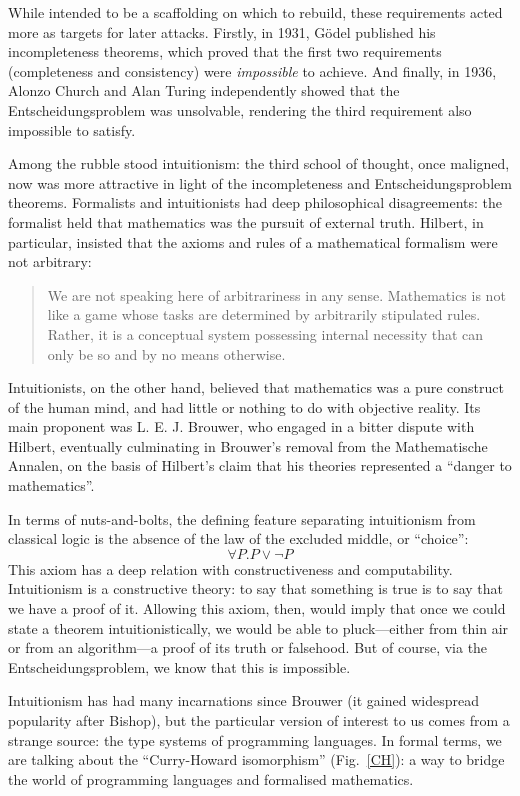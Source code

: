\documentclass[12pt]{article}
\begin{document}
While intended to be a scaffolding on which to rebuild, these requirements acted
more as targets for later attacks.
Firstly, in 1931, Gödel published his incompleteness theorems, which proved that the
first two requirements (completeness and consistency) were \emph{impossible} to
achieve.
And finally, in 1936, Alonzo Church and Alan Turing independently showed that
the Entscheidungsproblem was unsolvable, rendering the third requirement also
impossible to satisfy.

Among the rubble stood intuitionism: the third school of thought, once maligned,
now was more attractive in light of the incompleteness and Entscheidungsproblem
theorems.
Formalists and intuitionists had deep philosophical disagreements: the formalist
held that mathematics was the pursuit of external truth.
Hilbert, in particular, insisted that the axioms and rules of a mathematical
formalism were not arbitrary:
\begin{quote}
  We are not speaking here of arbitrariness in any sense. Mathematics is not
  like a game whose tasks are determined by arbitrarily stipulated rules.
  Rather, it is a conceptual system possessing internal necessity that can only
  be so and by no means otherwise.
\end{quote}
Intuitionists, on the other hand, believed that mathematics was a pure
construct of the human mind, and had little or nothing to do with objective
reality.
Its main proponent was L. E. J. Brouwer, who engaged in a bitter dispute with
Hilbert, eventually culminating in Brouwer's removal from the Mathematische
Annalen, on the basis of Hilbert's claim that his theories represented a
``danger to mathematics''.

In terms of nuts-and-bolts, the defining feature separating intuitionism from
classical logic is the absence of the law of the excluded middle, or ``choice'':
\begin{equation}
  \forall P. P \vee \neg P
\end{equation}
This axiom has a deep relation with constructiveness and computability.
Intuitionism is a constructive theory: to say that something is true is to say
that we have a proof of it.
Allowing this axiom, then, would imply that once we could state a theorem
intuitionistically, we would be able to pluck---either from thin air or from an
algorithm---a proof of its truth or falsehood.
But of course, via the Entscheidungsproblem, we know that this is impossible.

Intuitionism has had many incarnations since Brouwer (it gained widespread
popularity after Bishop), but the particular version of interest to us comes
from a strange source: the type systems of programming languages.
In formal terms, we are talking about the ``Curry-Howard isomorphism''
(Fig.~\ref{CH}): a way to bridge the world of programming languages and
formalised mathematics.
\end{document}
